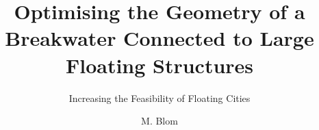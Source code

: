 \documentclass{layout/tudelft-report}
\begin{document}
\frontmatter

\title{Optimising the Geometry of a Breakwater Connected to Large Floating Structures}
\subtitle{Increasing the Feasibility of Floating Cities} %
\author{M. Blom}
\subject{Master Thesis}


\makecover



%


%

\tableofcontents




\listoffigures
\listoftables

\mainmatter



\printglossary[type=\acronymtype]




















% 
% 
% 






\setcounter{biburlnumpenalty}{7000}
\setcounter{biburllcpenalty}{7000}
\setcounter{biburlucpenalty}{7000}

\printbibliography[title=References]


\appendix





 






\end{document}
